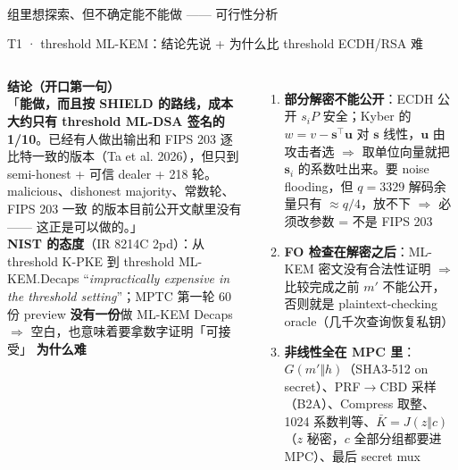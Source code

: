 \documentclass[aspectratio=169,10pt,fontset=none]{ctexbeamer}
\begin{document}
\begin{frame}
\vfill{}\\[6pt]{\normalsize 组里想探索、但不确定能不能做 —— 可行性分析}\vfill
\end{frame}
\begin{frame}{T1 · threshold ML-KEM：结论先说 + 为什么比 threshold ECDH/RSA 难}
\begin{columns}[T]
\textbf{结论（开口第一句）}\\
「\textbf{能做，而且按 SHIELD 的路线，成本大约只有 threshold ML-DSA 签名的 1/10}。已经有人做出输出和 FIPS 203 逐比特一致的版本（Ta et al. 2026），但只到 semi-honest + 可信 dealer + 218 轮。\alert{malicious、dishonest majority、常数轮、FIPS 203 一致} 的版本目前公开文献里没有 —— 这正是可以做的。」\\[4pt]
\textbf{NIST 的态度}（IR 8214C 2pd）：从 threshold K-PKE 到 threshold ML-KEM.Decaps ``\emph{impractically expensive in the threshold setting}''；MPTC 第一轮 60 份 preview \textbf{没有一份}做 ML-KEM Decaps $\Rightarrow$ 空白，也意味着要拿数字证明「可接受」
\textbf{为什么难}
\begin{enumerate}
  \item \textbf{部分解密不能公开}：ECDH 公开 $s_iP$ 安全；Kyber 的 $w=v-\mathbf s^\top\mathbf u$ 对 $\mathbf s$ 线性，$\mathbf u$ 由攻击者选 $\Rightarrow$ 取单位向量就把 $\mathbf s_i$ 的系数吐出来。要 noise flooding，但 $q=3329$ 解码余量只有 $\approx q/4$，放不下 $\Rightarrow$ 必须改参数 = 不是 FIPS 203
  \item \textbf{FO 检查在解密之后}：ML-KEM 密文没有合法性证明 $\Rightarrow$ 比较完成之前 $m'$ 不能公开，否则就是 plaintext-checking oracle（几千次查询恢复私钥）
  \item \textbf{非线性全在 MPC 里}：$G(m'\Vert h)$（SHA3-512 on secret）、PRF$\to$CBD 采样（B2A）、Compress 取整、1024 系数判等、$\bar K=J(z\Vert c)$（$z$ 秘密，$c$ 全部分组都要进 MPC）、最后 secret mux
\end{enumerate}
\end{columns}
\end{frame}
\end{document}
